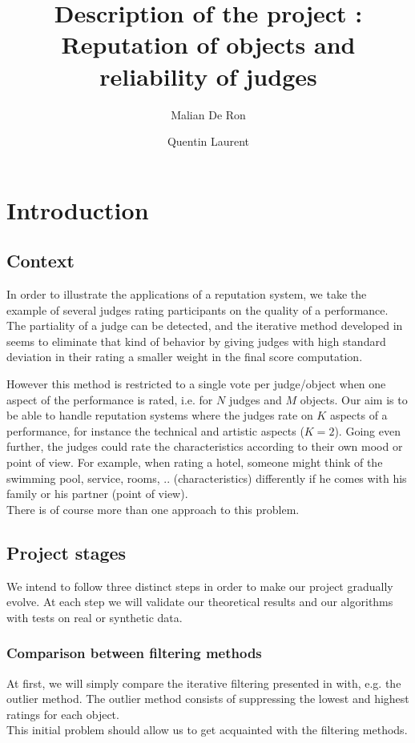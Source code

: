 \documentclass[12pt,a4paper]{article}
\title{Description of the project : Reputation of objects and reliability of judges}
\author{Malian De Ron \and Quentin Laurent}
\begin{document}
\maketitle

\tableofcontents
\section{Introduction}
\subsection*{Context}
In order to illustrate the applications of a reputation system, we take the example of several judges rating participants on the quality of a performance. The partiality of a judge can be detected, and the iterative method developed in \cite{Cristo1} seems to eliminate that kind of behavior by giving judges with high standard deviation in their rating a smaller weight in the final score computation.

However this method is restricted to a single vote per judge/object when one aspect of the performance is rated, i.e. for $N$ judges and $M$ objects. Our aim is to be able to handle reputation systems where the judges rate on $K$ aspects of a performance, for instance the technical and artistic aspects ($K=2$). 
Going even further, the judges could rate the characteristics according to their own mood or point of view. For example, when rating a hotel, someone might think of the swimming pool, service, rooms, .. (characteristics) differently if he comes with his family or his partner (point of view).\\
There is of course more than one approach to this problem. 

\subsection*{Project stages}
We intend to follow three distinct steps in order to make our project gradually evolve. At each step we will validate our theoretical results and our algorithms with tests on real or synthetic data.

\subsubsection*{Comparison between filtering methods}
At first, we will simply compare the iterative filtering presented in \cite{Cristo1} 
 with, e.g. the outlier method. The outlier method consists of suppressing the lowest and highest ratings for each object.\\
 This initial problem should allow us to get acquainted with the filtering methods.
\end{document}
